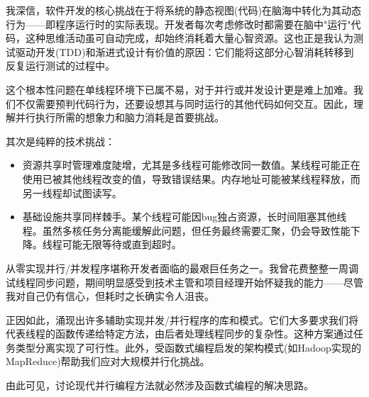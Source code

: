 我深信，软件开发的核心挑战在于将系统的静态视图(代码)在脑海中转化为其动态行为——即程序运行时的实际表现。开发者每次考虑修改时都需要在脑中"运行"代码，这种思维活动虽可自动完成，却始终消耗着大量心智资源。这也正是我认为测试驱动开发(TDD)和渐进式设计有价值的原因：它们能将这部分心智消耗转移到反复运行测试的过程中。

这个根本性问题在单线程环境下已属不易，对于并行或并发设计更是难上加难。我们不仅需要预判代码行为，还要设想其与同时运行的其他代码如何交互。因此，理解并行执行所需的想象力和脑力消耗是首要挑战。

其次是纯粹的技术挑战：

\begin{itemize}
\item 
资源共享时管理难度陡增，尤其是多线程可能修改同一数值。某线程可能正在使用已被其他线程改变的值，导致错误结果。内存地址可能被某线程释放，而另一线程却试图读写。

\item 
基础设施共享同样棘手。某个线程可能因bug独占资源，长时间阻塞其他线程。虽然多核任务分离能缓解此问题，但任务最终需要汇聚，仍会导致性能下降。线程可能无限等待或直到超时。
\end{itemize}

从零实现并行/并发程序堪称开发者面临的最艰巨任务之一。我曾花费整整一周调试线程同步问题，期间明显感受到技术主管和项目经理开始怀疑我的能力——尽管我对自己仍有信心，但耗时之长确实令人沮丧。

正因如此，涌现出许多辅助实现并发/并行程序的库和模式。它们大多要求我们将代表线程的函数传递给特定方法，由后者处理线程同步的复杂性。这种方案通过任务类型分离实现了可行性。此外，受函数式编程启发的架构模式(如Hadoop实现的MapReduce)帮助我们应对大规模并行化挑战。

由此可见，讨论现代并行编程方法就必然涉及函数式编程的解决思路。
